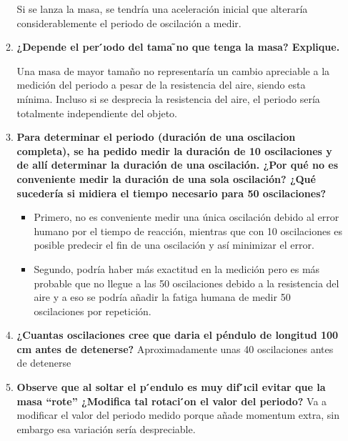 \begin{enumerate}
\begin{enumerate}
    Si se lanza la masa, se tendría una aceleración inicial que alteraría considerablemente el periodo de oscilación a medir.
    \item \textbf{¿Depende el per ́ıodo del tama ̃no que tenga la masa? Explique.}

    
Una masa de mayor tamaño no representaría un cambio apreciable a la medición del periodo a pesar de la resistencia del aire, siendo esta mínima. Incluso si se desprecia la resistencia del aire, el periodo sería totalmente independiente del objeto.
    \item \textbf{Para determinar el periodo (duración de una oscilacion completa), se ha pedido medir la duración de 10 oscilaciones y de allí determinar la duración de una oscilación. ¿Por qué no es conveniente medir la duración de una sola oscilación? ¿Qué sucedería si midiera el tiempo necesario para 50 oscilaciones?}
    \begin{itemize}
        \item Primero, no es conveniente medir una única oscilación debido al error humano por el tiempo de reacción, mientras que con 10 oscilaciones es posible predecir el fin de una oscilación y así minimizar el error.
        \item Segundo, podría haber más exactitud en la medición pero es más probable que no llegue a las 50 oscilaciones debido a la resistencia del aire y a eso se podría añadir la fatiga humana de medir 50 oscilaciones por repetición. 
    \end{itemize}

    \item \textbf{¿Cuantas oscilaciones cree que daria el péndulo de longitud 100 cm antes de detenerse?}
Aproximadamente unas 40 oscilaciones antes de detenerse  
    \item \textbf{Observe que al soltar el p ́endulo es muy dif ́ıcil evitar que la masa “rote” ¿Modifica tal rotaci ́on el valor del periodo?}
Va a modificar el valor del periodo medido porque añade momentum extra, sin embargo esa variación sería despreciable. 

\end{enumerate}

\end{enumerate}
